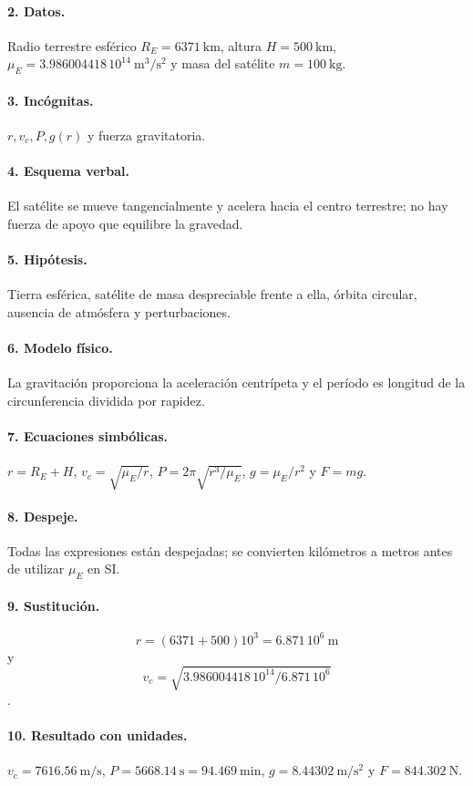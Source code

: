 \paragraph{2. Datos.} Radio terrestre esférico $R_E=6371\ \mathrm{km}$, altura $H=500\ \mathrm{km}$, $\mu_E=3.986004418\,10^{14}\ \mathrm{m^3/s^2}$ y masa del satélite $m=100\ \mathrm{kg}$.
\paragraph{3. Incógnitas.} $r,v_c,P,g(r)$ y fuerza gravitatoria.
\paragraph{4. Esquema verbal.} El satélite se mueve tangencialmente y acelera hacia el centro terrestre; no hay fuerza de apoyo que equilibre la gravedad.
\paragraph{5. Hipótesis.} Tierra esférica, satélite de masa despreciable frente a ella, órbita circular, ausencia de atmósfera y perturbaciones.
\paragraph{6. Modelo físico.} La gravitación proporciona la aceleración centrípeta y el período es longitud de la circunferencia dividida por rapidez.
\paragraph{7. Ecuaciones simbólicas.} $r=R_E+H$, $v_c=\sqrt{\mu_E/r}$, $P=2\pi\sqrt{r^3/\mu_E}$, $g=\mu_E/r^2$ y $F=mg$.
\paragraph{8. Despeje.} Todas las expresiones están despejadas; se convierten kilómetros a metros antes de utilizar $\mu_E$ en SI.
\paragraph{9. Sustitución.} \[r=(6371+500)10^3=6.871\,10^6\ \mathrm m\] y \[v_c=\sqrt{3.986004418\,10^{14}/6.871\,10^6}\].
\paragraph{10. Resultado con unidades.} $v_c=7616.56\ \mathrm{m/s}$, $P=5668.14\ \mathrm s=94.469\ \mathrm{min}$, $g=8.44302\ \mathrm{m/s^2}$ y $F=844.302\ \mathrm N$.
